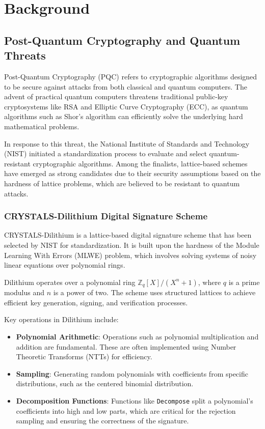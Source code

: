 
\chapter{Background}
\thispagestyle{chapterstart}

\section{Post-Quantum Cryptography and Quantum Threats}

Post-Quantum Cryptography (\ac{PQC}) refers to cryptographic algorithms designed to be secure against attacks from both classical and quantum computers. The advent of practical quantum computers threatens traditional public-key cryptosystems like RSA and Elliptic Curve Cryptography (\ac{ECC}), as quantum algorithms such as Shor's algorithm can efficiently solve the underlying hard mathematical problems.

In response to this threat, the National Institute of Standards and Technology (\ac{NIST}) initiated a standardization process to evaluate and select quantum-resistant cryptographic algorithms. Among the finalists, lattice-based schemes have emerged as strong candidates due to their security assumptions based on the hardness of lattice problems, which are believed to be resistant to quantum attacks.

\subsection{CRYSTALS-Dilithium Digital Signature Scheme}

CRYSTALS-Dilithium is a lattice-based digital signature scheme that has been selected by NIST for standardization. It is built upon the hardness of the Module Learning With Errors (MLWE) problem, which involves solving systems of noisy linear equations over polynomial rings.

Dilithium operates over a polynomial ring $\mathbb{Z}_q[X]/(X^n + 1)$, where $q$ is a prime modulus and $n$ is a power of two. The scheme uses structured lattices to achieve efficient key generation, signing, and verification processes.

Key operations in Dilithium include:

\begin{itemize}
    \item \textbf{Polynomial Arithmetic}: Operations such as polynomial multiplication and addition are fundamental. These are often implemented using Number Theoretic Transforms (NTTs) for efficiency.
    \item \textbf{Sampling}: Generating random polynomials with coefficients from specific distributions, such as the centered binomial distribution.
    \item \textbf{Decomposition Functions}: Functions like \texttt{Decompose} split a polynomial's coefficients into high and low parts, which are critical for the rejection sampling and ensuring the correctness of the signature.
\end{itemize}

